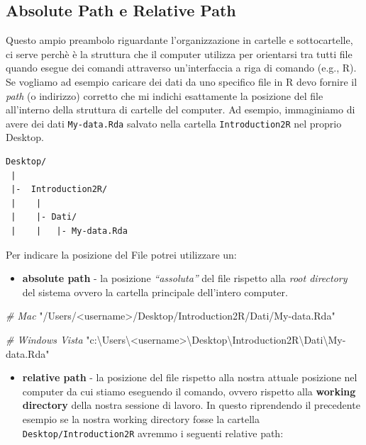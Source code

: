 \documentclass[
]{book}
\newenvironment{Shaded}{\begin{snugshade}}{\end{snugshade}}
\newcommand{\CommentTok}[1]{\textcolor[rgb]{0.56,0.35,0.01}{\textit{#1}}}
\newcommand{\StringTok}[1]{\textcolor[rgb]{0.31,0.60,0.02}{#1}}
\providecommand{\tightlist}{%
  \setlength{\itemsep}{0pt}\setlength{\parskip}{0pt}}
\begin{document}
\hypertarget{absolute-path-e-relative-path}{%
\subsection{Absolute Path e Relative Path}\label{absolute-path-e-relative-path}}

Questo ampio preambolo riguardante l'organizzazione in cartelle e sottocartelle, ci serve perchè è la struttura che il computer utilizza per orientarsi tra tutti file quando esegue dei comandi attraverso un'interfaccia a riga di comando (e.g., R). Se vogliamo ad esempio caricare dei dati da uno specifico file in R devo fornire il \emph{path} (o indirizzo) corretto che mi indichi esattamente la posizione del file all'interno della struttura di cartelle del computer. Ad esempio, immaginiamo di avere dei dati \texttt{My-data.Rda} salvato nella cartella \texttt{Introduction2R} nel proprio Desktop.

\begin{verbatim}
Desktop/
 |
 |-  Introduction2R/
 |    |
 |    |- Dati/
 |    |   |- My-data.Rda
\end{verbatim}

Per indicare la posizione del File potrei utilizzare un:

\begin{itemize}
\tightlist
\item
  \textbf{absolute path} - la posizione \emph{``assoluta''} del file rispetto alla \emph{root directory} del sistema ovvero la cartella principale dell'intero computer.
\end{itemize}

\begin{Shaded}
\begin{Highlighting}[]
\CommentTok{# Mac}
\StringTok{"/Users/<username>/Desktop/Introduction2R/Dati/My-data.Rda"}

\CommentTok{# Windows Vista}
\StringTok{"c:\textbackslash{}Users\textbackslash{}<username>\textbackslash{}Desktop\textbackslash{}Introduction2R\textbackslash{}Dati\textbackslash{}My-data.Rda"}
\end{Highlighting}
\end{Shaded}

\begin{itemize}
\tightlist
\item
  \textbf{relative path} - la posizione del file rispetto alla nostra attuale posizione nel computer da cui stiamo eseguendo il comando, ovvero rispetto alla \textbf{working directory} della nostra sessione di lavoro. In questo riprendendo il precedente esempio se la nostra working directory fosse la cartella \texttt{Desktop/Introduction2R} avremmo i seguenti relative path:
\end{itemize}
\end{document}
